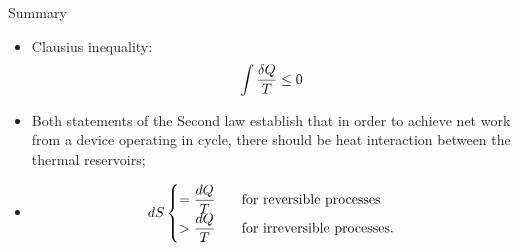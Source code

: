    
\clearpage   
\begin{FinalSummaryBlock}{Summary}
    \begin{itemize}
       \item Clausius inequality:
            \begin{displaymath}
                \displaystyle\int \displaystyle\frac{\delta Q}{T} \le 0
            \end{displaymath}
       \item Both statements of the Second law establish that in order to achieve net work from a device operating in cycle, there should be heat interaction between the thermal reservoirs;
       \item 
           \begin{displaymath}
               dS
                \begin{cases}
                      = \displaystyle\frac{dQ}{T} & \;\;\text{ for reversible processes} \\
                      > \displaystyle\frac{dQ}{T} & \;\;\text{ for irreversible processes}.
                \end{cases}
           \end{displaymath}
    \end{itemize}
\end{FinalSummaryBlock}
